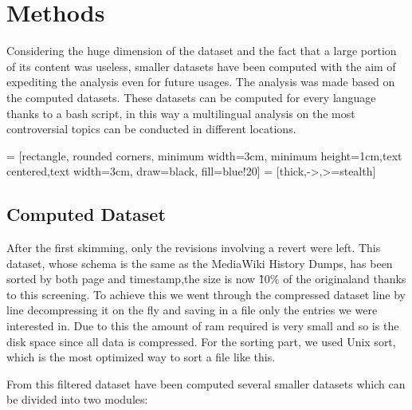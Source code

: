\chapter{Methods}

Considering the huge dimension of the dataset and the fact that a large portion of its content was
useless, smaller datasets have been computed with the aim of expediting the analysis even for future
usages. The analysis was made based on the computed datasets. These datasets can be computed for
every language thanks to a bash script, in this way a multilingual analysis on the most
controversial topics can be conducted in different locations.


\bigskip



 = [rectangle, rounded corners, minimum width=3cm, minimum height=1cm,text centered,text width=3cm, draw=black, fill=blue!20]
 = [thick,->,>=stealth]


\bigskip

\section{Computed Dataset}
After the first skimming, only the revisions involving a revert were left. This dataset, whose
schema is the same as the MediaWiki History Dumps, has been sorted by both page and timestamp,the
size is now \~10\% of the originaland thanks to this screening. To achieve this we went through the
compressed dataset line by line decompressing it on the fly and saving in a file only the entries we
were interested in. Due to this the amount of ram required is very small and so is the disk space
since all data is compressed. For the sorting part, we used Unix sort, which is the most optimized
way to sort a file like this.  

From this filtered dataset have been computed several smaller datasets which can be divided into two modules: 

